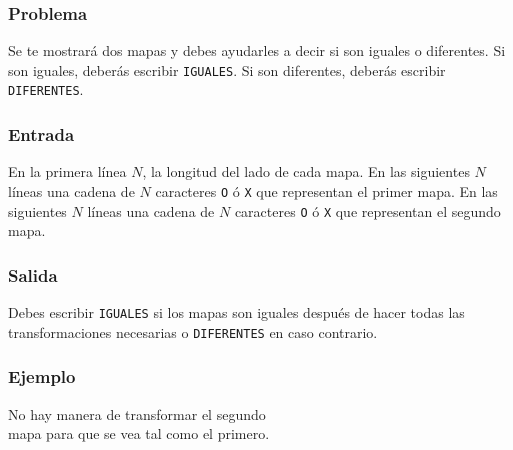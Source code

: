  \subsubsection*{Problema}
 Se te mostrará dos mapas y debes ayudarles a decir si son iguales o diferentes. Si son iguales, deberás escribir \verb|IGUALES|. Si son diferentes, deberás escribir \verb|DIFERENTES|.
 
 \subsubsection*{Entrada}
 En la primera línea \(N\), la longitud del lado de cada mapa. En las siguientes \(N\) líneas una cadena de \(N\) caracteres \verb|O| ó \verb|X| que representan el primer mapa. En las siguientes \(N\) líneas una cadena de \(N\) caracteres \verb|O| ó \verb|X| que representan el segundo mapa.
\subsubsection*{Salida}
Debes escribir \verb|IGUALES| si los mapas son iguales después de hacer todas las transformaciones necesarias o \verb|DIFERENTES| en caso contrario.

\subsubsection*{Ejemplo}
\begin{casebox3}
	{No hay manera de transformar el segundo \\mapa para que se vea tal como el primero.}
\end{casebox3}

